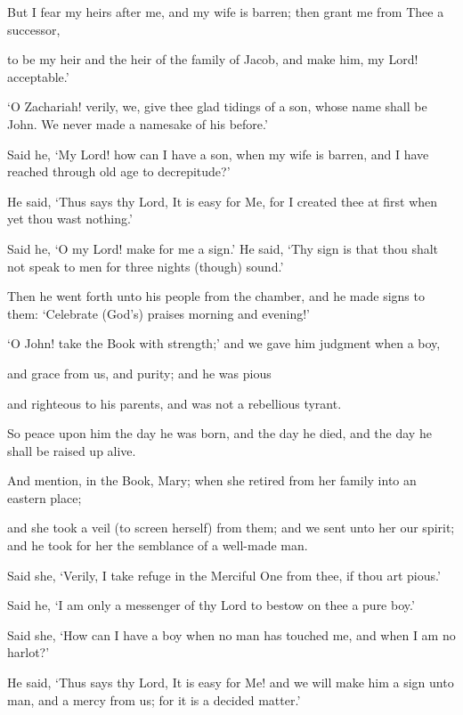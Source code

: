 \documentclass[fontsize=14pt, letterpaper, notitlepage, openany, DIV=12]{scrbook} %
\begin{document}
\noindent[19:5]
But I fear my heirs after me, and my wife is barren; then grant me from Thee a successor,

\noindent[19:6]
to be my heir and the heir of the family of Jacob, and make him, my Lord! acceptable.'

\noindent[19:7]
`O Zachariah! verily, we, give thee glad tidings of a son, whose name shall be John. We
never made a namesake of his before.'

\noindent[19:8]
Said he, `My Lord! how can I have a son, when my wife is barren, and I have reached
through old age to decrepitude?'

\noindent[19:9]
He said, `Thus says thy Lord, It is easy for Me, for I created thee at first when yet thou
wast nothing.'

\noindent[19:10]
Said he, `O my Lord! make for me a sign.' He said, `Thy sign is that thou shalt not speak
to men for three nights (though) sound.'

\noindent[19:11]
Then he went forth unto his people from the chamber, and he made signs to them:
`Celebrate (God's) praises morning and evening!'

\noindent[19:12]
`O John! take the Book with strength;' and we gave him judgment when a boy,

\noindent[19:13]
and grace from us, and purity; and he was pious

\noindent[19:14]
and righteous to his parents, and was not a rebellious tyrant.

\noindent[19:15]
So peace upon him the day he was born, and the day he died, and the day he shall be
raised up alive.

\noindent[19:16]
And mention, in the Book, Mary; when she retired from her family into an eastern place;

\noindent[19:17]
and she took a veil (to screen herself) from them; and we sent unto her our spirit; and he
took for her the semblance of a well-made man.

\noindent[19:18]
Said she, `Verily, I take refuge in the Merciful One from thee, if thou art pious.'

\noindent[19:19]
Said he, `I am only a messenger of thy Lord to bestow on thee a pure boy.'

\noindent[19:20]
Said she, `How can I have a boy when no man has touched me, and when I am no
harlot?'

\noindent[19:21]
He said, `Thus says thy Lord, It is easy for Me! and we will make him a sign unto man,
and a mercy from us; for it is a decided matter.'
\end{document}
